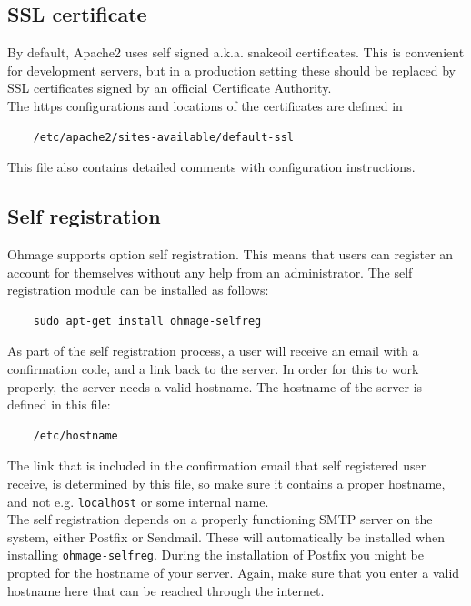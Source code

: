 \documentclass{scrartcl}
\begin{document}
\subsection{SSL certificate}
\label{ssl}

By default, Apache2 uses self signed a.k.a. snakeoil certificates. This is
convenient for development servers, but in a production setting these
should be replaced by SSL certificates signed by an official Certificate Authority. \\

\noindent The https configurations and locations of the certificates are defined
in

\begin{verbatim}
    /etc/apache2/sites-available/default-ssl
\end{verbatim}
This file also contains detailed comments with configuration instructions.

\subsection{Self registration}
\label{selfreg}

Ohmage supports option self registration. This means that users can register an 
account for themselves without any help from an administrator. The self
registration module can be installed as follows:

\begin{verbatim}
    sudo apt-get install ohmage-selfreg
\end{verbatim}

\noindent As part of the self registration process, a user will receive an email
with a confirmation code, and a link back to the server. In order for this to
work properly, the server needs a valid hostname. The hostname of the server is
defined in this file:

\begin{verbatim}
    /etc/hostname
\end{verbatim}

\noindent The link that is included in the confirmation email that self
registered user receive, is determined by this file, so make sure it contains a
proper hostname, and not e.g. \texttt{localhost} or some internal name. \\

\noindent The self registration depends on a properly functioning
SMTP server on the system, either Postfix or Sendmail. These will automatically
be installed when installing \texttt{ohmage-selfreg}. During the installation of
Postfix you might be propted for the hostname of your server. Again, make sure
that you enter a valid hostname here that can be reached through the internet.
\end{document}
